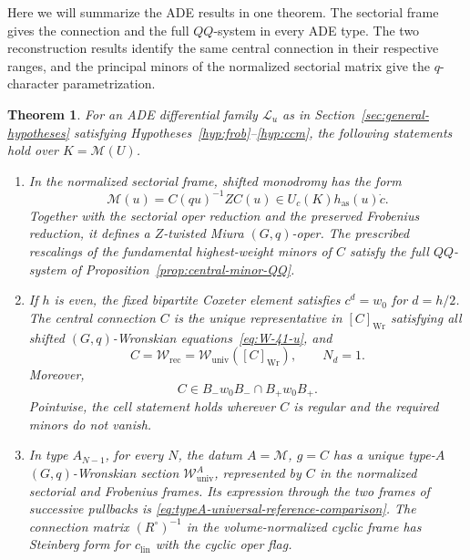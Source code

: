 \documentclass[11pt,leqno]{amsart}
\numberwithin{equation}{section}
\theoremstyle{plain}
\newtheorem{theorem}{Theorem}[section]
\theoremstyle{definition}
\theoremstyle{plain}
\theoremstyle{definition}
\theoremstyle{remark}
\begin{document}
Here we will summarize the ADE results in one theorem. The sectorial frame gives the connection and the full $QQ$-system in every ADE type. The two reconstruction results identify the same central connection in their respective ranges, and the principal minors of the normalized sectorial matrix give the $q$-character parametrization.

\begin{theorem}\label{thm:general-final}\label{thm:general-orbit}\label{cor:typeA-even-finite}\label{cor:FFH-typeA-even-finite}
For an ADE differential family $\mathcal L_u$ as in Section~\ref{sec:general-hypotheses} satisfying Hypotheses~\ref{hyp:frob}--\ref{hyp:ccm}, the following statements hold over $K=\mathcal M(U)$.
\begin{enumerate}[label=(\roman*),topsep=3pt,itemsep=5pt]
\item In the normalized sectorial frame, shifted monodromy has the form
\begin{equation}\label{eq:unified-ADE-central-Wronskian}
 \mathscr M(u)=C(qu)^{-1}ZC(u)
 \in U_c(K)h_{\mathrm{as}}(u)\dot c.
\end{equation}
Together with the sectorial oper reduction and the preserved Frobenius reduction, it defines a $Z$-twisted Miura $(G,q)$-oper. The prescribed rescalings of the fundamental highest-weight minors of $C$ satisfy the full $QQ$-system of Proposition~\ref{prop:central-minor-QQ}.

\item If $h$ is even, the fixed bipartite Coxeter element satisfies $c^d=w_0$ for $d=h/2$. The central connection $C$ is the unique representative in $[C]_{\mathrm{Wr}}$ satisfying all shifted $(G,q)$-Wronskian equations~\eqref{eq:W-41-u}, and
\begin{equation}\label{eq:general-orbit-identification}
 C=\mathscr W_{\mathrm{rec}}
  =\mathscr W_{\mathrm{univ}}([C]_{\mathrm{Wr}}),
 \qquad N_d=1.
\end{equation}
\makeatletter
\begingroup
\edef\@currentlabel{\theequation}
\label{eq:C-equals-Wrec}
\endgroup
\makeatother
Moreover,
\begin{equation}\label{eq:C-two-longest-cells}
 C\in B_-w_0B_-\cap B_+w_0B_+.
\end{equation}
Pointwise, the cell statement holds wherever $C$ is regular and the required minors do not vanish.

\item In type $A_{N-1}$, for every $N$, the datum $A=\mathscr M$, $g=C$ has a unique type-$A$ $(G,q)$-Wronskian section $\mathscr W_{\mathrm{univ}}^A$, represented by $C$ in the normalized sectorial and Frobenius frames. Its expression through the two frames of successive pullbacks is \eqref{eq:typeA-universal-reference-comparison}. The connection matrix $(R^\circ)^{-1}$ in the volume-normalized cyclic frame has Steinberg form for $c_{\mathrm{lin}}$ with the cyclic oper flag.


\end{enumerate}
\end{theorem}
\end{document}
